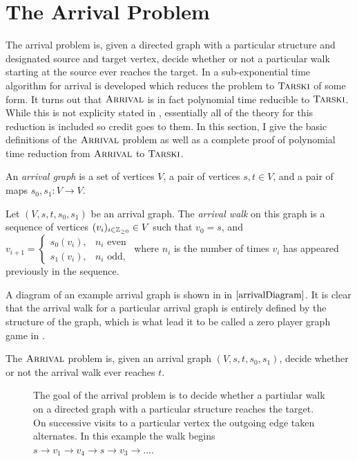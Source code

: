 \section{The Arrival Problem} \label{arr}
\newcommand{\flowin}{\ensuremath{f_{\text{in}}}}
\newcommand{\glowin}{\ensuremath{g_{\text{in}}}}

The arrival problem is, given a directed graph with
a particular structure and designated source and target vertex,
decide whether or not a particular walk starting at the source
ever reaches the target. In \citep{gärtner2021subexponential} a sub-exponential
time algorithm for arrival is developed which reduces the problem to $\textsc{Tarski}$ of some form.
It turns out that $\textsc{Arrival}$ is in fact polynomial time reducible to $\textsc{Tarski}$.
While this is not explicity stated in \citep{gärtner2021subexponential}, essentially
all of the theory for this reduction is included so credit goes to them. In this section,
I give the basic definitions of the $\textsc{Arrival}$ problem as well as a complete proof
of polynomial time reduction from $\textsc{Arrival}$ to $\textsc{Tarski}$.
\begin{definition}
  An \emph{arrival graph} is a set of vertices $V$, a pair of
  vertices $s, t \in V$, and a pair of maps 
  $s_0, s_1 : V \to V$. 
\end{definition}
\begin{definition}
  Let $(V, s, t, s_0, s_1)$ be an arrival graph. The \emph{arrival walk}
  on this graph is a sequence of vertices $(v_i)_{i \in \mathbb{Z}_{\geq 0}} \in V$
  such that $v_0 = s$, and $v_{i+1} = 
  \begin{cases} 
    s_0(v_i), & \text{$n_i$ even}\\  
    s_1(v_i), & \text{$n_i$ odd},
  \end{cases}$
  where $n_i$ is the number of times $v_i$ has appeared previously in
  the sequence.
\end{definition}
 A diagram of an example arrival graph is shown in 
in $\cref{arrivalDiagram}$.
It is clear that the arrival walk for a particular arrival graph
is entirely defined by the structure of the graph, which is what
lead it to be called a zero player graph game in \citep{arrivalBasic}.
\begin{definition}
  The $\textsc{Arrival}$ problem is, given an arrival graph $(V, s, t, s_0, s_1)$,
  decide whether or not the arrival walk ever reaches $t$.
\end{definition}
\begin{figure}[h]
  \centering
  
  \caption{The goal of the arrival problem is to decide whether a partiular walk on a directed graph with a particular
  structure reaches the target. On successive visits to a particular
  vertex the outgoing edge taken alternates. In this example
  the walk begins $s \to v_1 \to v_4 \to s \to v_3 \to \ldots$.} \label{arrivalDiagram}
\end{figure}
